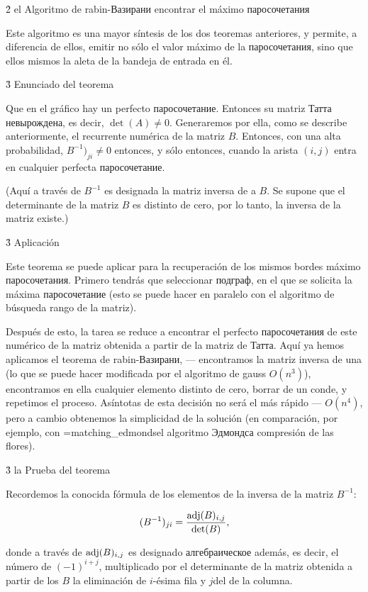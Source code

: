 \h2{ el Algoritmo de rabin-Вазирани encontrar el máximo паросочетания }

Este algoritmo es una mayor síntesis de los dos teoremas anteriores, y permite, a diferencia de ellos, emitir no sólo el valor máximo de la паросочетания, sino que ellos mismos la aleta de la bandeja de entrada en él.


\h3{ Enunciado del teorema }

Que en el gráfico hay un perfecto паросочетание. Entonces su matriz Татта невырождена, es decir, $\det(A) \ne 0$. Generaremos por ella, como se describe anteriormente, el recurrente numérica de la matriz $B$. Entonces, con una alta probabilidad, $B^{-1})_{ji} \ne 0$ entonces, y sólo entonces, cuando la arista $(i,j)$ entra en cualquier perfecta паросочетание.

(Aquí a través de $B^{-1}$ es designada la matriz inversa de a $B$. Se supone que el determinante de la matriz $B$ es distinto de cero, por lo tanto, la inversa de la matriz existe.)


\h3{ Aplicación }

Este teorema se puede aplicar para la recuperación de los mismos bordes máximo паросочетания. Primero tendrás que seleccionar подграф, en el que se solicita la máxima паросочетание (esto se puede hacer en paralelo con el algoritmo de búsqueda rango de la matriz).

Después de esto, la tarea se reduce a encontrar el perfecto паросочетания de este numérico de la matriz obtenida a partir de la matriz de Татта. Aquí ya hemos aplicamos el teorema de rabin-Вазирани, --- encontramos la matriz inversa de una (lo que se puede hacer modificada por el algoritmo de gauss $O (n^3)$), encontramos en ella cualquier elemento distinto de cero, borrar de un conde, y repetimos el proceso. Asíntotas de esta decisión no será el más rápido --- $O (n^4)$, pero a cambio obtenemos la simplicidad de la solución (en comparación, por ejemplo, con \algohref=matching_edmonds{el algoritmo Эдмондса compresión de las flores}).


\h3{ la Prueba del teorema }

Recordemos la conocida fórmula de los elementos de la inversa de la matriz $B^{-1}$:

$$ (B^{-1})_{ji} = \frac{ {\rm adj}(B)_{i,j} }{ \det(B) }, $$

donde a través de ${\rm adj}(B)_{i,j}$ es designado алгебраическое además, es decir, el número de $(-1)^{i+j}$, multiplicado por el determinante de la matriz obtenida a partir de los $B$ la eliminación de $i$-ésima fila y $j$del de la columna.

